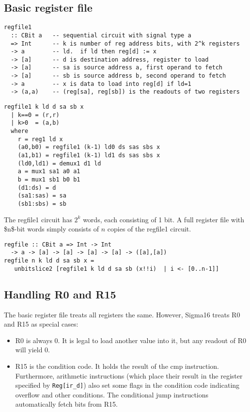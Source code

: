 \documentclass[11pt]{article}
\begin{document}
\subsection{Basic register file}
\label{sec:org8779f76}

\begin{verbatim}
regfile1
  :: CBit a   -- sequential circuit with signal type a
  => Int      -- k is number of reg address bits, with 2^k registers
  -> a        -- ld.  if ld then reg[d] := x
  -> [a]      -- d is destination address, register to load
  -> [a]      -- sa is source address a, first operand to fetch
  -> [a]      -- sb is source address b, second operand to fetch
  -> a        -- x is data to load into reg[d] if ld=1
  -> (a,a)    -- (reg[sa], reg[sb]) is the readouts of two registers
\end{verbatim}

\begin{verbatim}
regfile1 k ld d sa sb x
  | k==0 = (r,r)
  | k>0  = (a,b)
  where
    r = reg1 ld x
    (a0,b0) = regfile1 (k-1) ld0 ds sas sbs x
    (a1,b1) = regfile1 (k-1) ld1 ds sas sbs x
    (ld0,ld1) = demux1 d1 ld
    a = mux1 sa1 a0 a1
    b = mux1 sb1 b0 b1
    (d1:ds) = d
    (sa1:sas) = sa
    (sb1:sbs) = sb
\end{verbatim}

The regfile1 circuit has \(2^{k}\) words, each consisting of 1 bit.  A
full register file with \$n\$-bit words simply consists of \(n\) copies of
the regfile1 circuit.

\begin{verbatim}
regfile :: CBit a => Int -> Int
  -> a -> [a] -> [a] -> [a] -> [a] -> ([a],[a])
regfile n k ld d sa sb x =
   unbitslice2 [regfile1 k ld d sa sb (x!!i)  | i <- [0..n-1]]
\end{verbatim}


\subsection{Handling R0 and R15}
\label{sec:org0f3e9d7}

The basic register file treats all registers the same.  However,
Sigma16 treats R0 and R15 as special cases:

\begin{itemize}
\item R0 is always 0.  It is legal to load another value into it, but any
readout of R0 will yield 0.

\item R15 is the condition code.  It holds the result of the cmp
instruction.  Furthermore, arithmetic instructions (which place
their result in the register specified by \texttt{Reg[ir\_d]}) also set some
flags in the condition code indicating overflow and other
conditions.  The conditional jump instructions automatically fetch
bits from R15.
\end{itemize}
\end{document}
